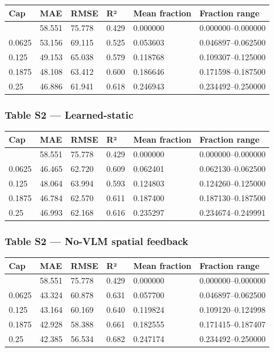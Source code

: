 \documentclass[11pt,a4paper]{article}
\begin{document}
{ %
\begin{longtable}[]{@{}llllll@{}}
\toprule\noalign{}
Cap & MAE & RMSE & R² & Mean fraction & Fraction range \\
\midrule\noalign{}
\endhead
\bottomrule\noalign{}
\endlastfoot
0.0 & 58.551 & 75.778 & 0.429 & 0.000000 & 0.000000--0.000000 \\
0.0625 & 53.156 & 69.115 & 0.525 & 0.053603 & 0.046897--0.062500 \\
0.125 & 49.153 & 65.038 & 0.579 & 0.118768 & 0.109307--0.125000 \\
0.1875 & 48.108 & 63.412 & 0.600 & 0.186646 & 0.171598--0.187500 \\
0.25 & 46.886 & 61.941 & 0.618 & 0.246943 & 0.234492--0.250000 \\
\end{longtable}
}

\subsubsection{Table S2 --- Learned-static}\label{table-s2-learned-static}

{ %
\begin{longtable}[]{@{}llllll@{}}
\toprule\noalign{}
Cap & MAE & RMSE & R² & Mean fraction & Fraction range \\
\midrule\noalign{}
\endhead
\bottomrule\noalign{}
\endlastfoot
0.0 & 58.551 & 75.778 & 0.429 & 0.000000 & 0.000000--0.000000 \\
0.0625 & 46.465 & 62.720 & 0.609 & 0.062401 & 0.062130--0.062500 \\
0.125 & 48.064 & 63.994 & 0.593 & 0.124803 & 0.124260--0.125000 \\
0.1875 & 46.784 & 62.570 & 0.611 & 0.187400 & 0.187130--0.187500 \\
0.25 & 46.993 & 62.168 & 0.616 & 0.235297 & 0.234674--0.249991 \\
\end{longtable}
}

\subsubsection{Table S2 --- No-VLM spatial feedback}\label{table-s2-no-vlm-spatial-feedback}

{ %
\begin{longtable}[]{@{}llllll@{}}
\toprule\noalign{}
Cap & MAE & RMSE & R² & Mean fraction & Fraction range \\
\midrule\noalign{}
\endhead
\bottomrule\noalign{}
\endlastfoot
0.0 & 58.551 & 75.778 & 0.429 & 0.000000 & 0.000000--0.000000 \\
0.0625 & 43.324 & 60.878 & 0.631 & 0.057700 & 0.046897--0.062500 \\
0.125 & 43.164 & 60.169 & 0.640 & 0.119824 & 0.109120--0.124998 \\
0.1875 & 42.928 & 58.388 & 0.661 & 0.182555 & 0.171415--0.187407 \\
0.25 & 42.385 & 56.534 & 0.682 & 0.247174 & 0.234492--0.250000 \\
\end{longtable}
}
\end{document}
